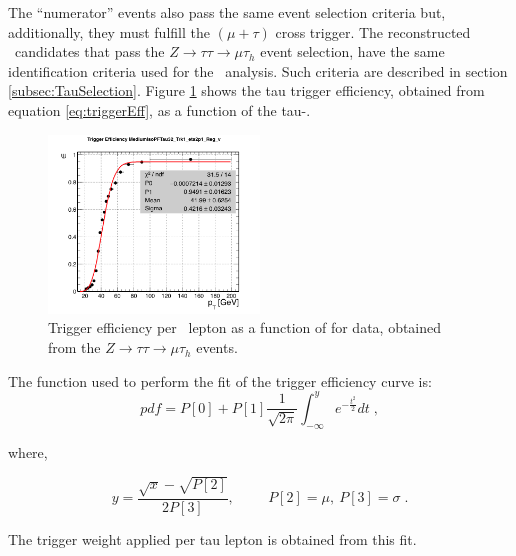 \noindent The ``numerator'' events also pass the same event selection criteria 
but, additionally, they must fulfill the $(\mu+\tau)$ cross trigger. The reconstructed \tauh~candidates
that pass the $Z \rightarrow \tau\tau \rightarrow \mu\tau_{h}$ event selection, have the same 
identification criteria used for the \Zprimetotauh~analysis. Such criteria 
are described in section \ref{subsec:TauSelection}. Figure \ref{fig:triggerEFf}
shows the tau trigger efficiency, obtained from equation \ref{eq:triggerEff}, as a 
function of the tau-\pt.

\begin{figure}[ht]
\begin{center}
\captionsetup[subfloat]{farskip=0pt,captionskip=0.0cm,labelformat=empty}
\includegraphics[clip,width=0.5\textwidth]{figuras/Chapter5/DiTauTriggerEfficiency_full_lumi.png}
 \caption{
  Trigger efficiency per \tauh~lepton as a function of \pt for data,
  obtained from the $Z \rightarrow \tau\tau \rightarrow \mu\tau_{h}$ events.
   }\label{fig:triggerEFf}
\end{center}
\end{figure}

\noindent The function used to perform the fit of the trigger efficiency curve is:
\begin{equation}
pdf=P[0]+P[1]\frac{1}{\sqrt{2\pi}}\int_{-\infty}^{y}e^{-\frac{t^{2}}{2}}dt \; ,
\end{equation}

\noindent where,

\begin{equation}
y=\frac{\sqrt{x}-\sqrt{P[2]}}{2P[3]}, \hspace{1cm} P[2]=\mu,\ P[3]=\sigma \; .
\end{equation}

\noindent The trigger weight applied per tau lepton is obtained from 
this fit.\\

